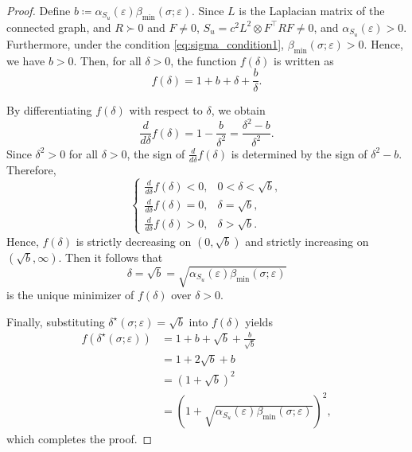 \documentclass[letterpaper,10pt,conference]{ieeeconf}
\begin{document}
\begin{proof}
  Define $b \coloneqq \alpha_{S_u}(\varepsilon)\beta_{\min}(\sigma;\varepsilon)$.
  Since $L$ is the Laplacian matrix of the connected graph, and $R\succ 0$ and $F \neq 0$, $S_u = c^2L^2 \otimes F^\top RF \neq0$, and $\alpha_{S_u}(\varepsilon)>0$.
  Furthermore, under the condition \eqref{eq:sigma_condition1}, $\beta_{\min}(\sigma;\varepsilon)>0$.
  Hence, we have $b > 0$.
  Then, for all $\delta>0$, the function $f(\delta)$ is written as
  \begin{equation}
    f(\delta) = 1 + b + \delta + \frac{b}{\delta}.
  \end{equation}

  By differentiating $f(\delta)$ with respect to $\delta$, we obtain
  \begin{equation}
    \frac{d}{d\delta}f(\delta)
    = 1 - \frac{b}{\delta^2}
    = \frac{\delta^2-b}{\delta^2}.
  \end{equation}
  Since $\delta^2>0$ for all $\delta>0$, the sign of $\frac{d}{d\delta}f(\delta)$ is determined by the sign of $\delta^2-b$.
  Therefore,
  \begin{equation}
    \begin{cases}
      \frac{d}{d\delta}f(\delta) < 0, & 0<\delta<\sqrt{b}, \\
      \frac{d}{d\delta}f(\delta) = 0, & \delta=\sqrt{b}, \\
      \frac{d}{d\delta}f(\delta) > 0, & \delta>\sqrt{b}.
    \end{cases}
  \end{equation}
  Hence, $f(\delta)$ is strictly decreasing on $(0,\sqrt{b})$ and strictly increasing on $(\sqrt{b},\infty)$.
  Then it follows that
  \begin{equation}
    \delta
    =
    \sqrt{b}
    =
    \sqrt{\alpha_{S_u}(\varepsilon)\beta_{\min}(\sigma;\varepsilon)}
  \end{equation}
  is the unique minimizer of $f(\delta)$ over $\delta>0$.

  Finally, substituting $\delta^\star(\sigma;\varepsilon)=\sqrt{b}$ into $f(\delta)$ yields
  \begin{align}
    f(\delta^\star(\sigma;\varepsilon))
    &= 1 + b + \sqrt{b} + \frac{b}{\sqrt{b}} \\
    &= 1 + 2\sqrt{b} + b \\
    &= \left(1+\sqrt{b}\right)^2 \\
    &= \left(
      1+\sqrt{\alpha_{S_u}(\varepsilon)\beta_{\min}(\sigma;\varepsilon)}
    \right)^2,
  \end{align}
  which completes the proof.
\end{proof}
\end{document}
